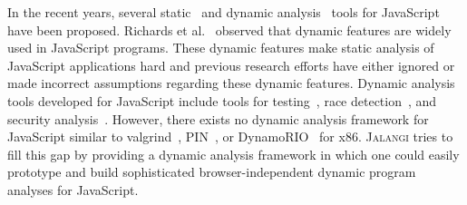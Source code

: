\documentclass{sig-alternate}
\def\jalangi{\textsc{Jalangi}}
\begin{document}
In the recent years, several
static~\cite{Yu:2007:JIB:1190216.1190252,Jensen:2010:IAL:1882094.1882114,Anderson:2005:TTI:2144892.2144917,manuicse13,Wei:2012:BAJ:2384716.2384758,Sridharan:2012:CTP:2367163.2367191}
and dynamic
analysis~\cite{Petrov:2012:RDW:2254064.2254095,Richards:2010:ADB:1806596.1806598,Artzi:2011:FAT:1985793.1985871,Mesbah:2009:IAT:1555001.1555037}
tools for JavaScript have been proposed.  Richards et
al.~\cite{Richards:2010:ADB:1806596.1806598} observed that dynamic
features are widely used in JavaScript programs.  These dynamic
features make static analysis of JavaScript applications hard and
previous research efforts have either ignored or made incorrect
assumptions regarding these dynamic features.  Dynamic analysis tools
developed for JavaScript include tools for
testing~\cite{Artzi:2011:FAT:1985793.1985871,Saxena:2010:SEF:1849417.1849985},
race detection~\cite{Petrov:2012:RDW:2254064.2254095}, and security
analysis~\cite{Vikram:2009:RAS:1653662.1653685}.  However, there
exists no dynamic analysis framework for JavaScript similar to
valgrind~\cite{Nethercote:2007:VFH:1250734.1250746},
PIN~\cite{Luk:2005:PBC:1065010.1065034}, or
DynamoRIO~\cite{Bruening:2003:IAD:776261.776290} for x86.  \jalangi{}
tries to fill this gap by providing a dynamic analysis framework in
which one could easily prototype and build sophisticated
browser-independent dynamic program analyses for JavaScript.
\end{document}
